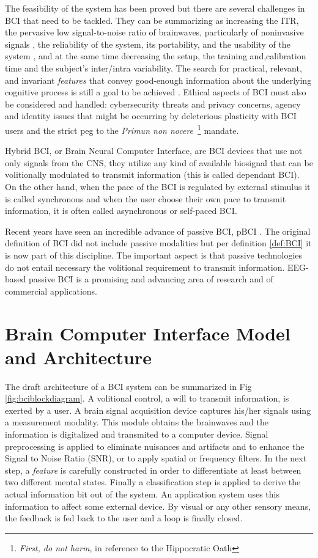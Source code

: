The feasibility of the system has been proved but there are several challenges in BCI that need to be tackled. They can be summarizing as 
increasing the ITR, the pervasive low signal-to-noise ratio of brainwaves, particularly of noninvasive signals \cite{Lotte2018}, the reliability of the system, its portability, and the usability of the system \cite{Wang2018}, and at the same time decreasing the setup, the training and,calibration time and the subject's inter/intra variability. The search for practical, relevant, and invariant \textit{features} that convey good-enough information about the underlying cognitive process is still a goal to be achieved \cite{Perdikis2014}.  Ethical aspects of BCI \cite{Yuste2017} must also be considered and handled: cybersecurity threats and privacy concerns,  agency and identity issues that might be occurring by deleterious plasticity with BCI users and the strict peg to the \textit{Primun non nocere}~\footnote{\textit{First, do not harm}, in reference to the Hippocratic Oath} mandate.

Hybrid BCI, or Brain Neural Computer Interface, are BCI devices that use not only signals from the CNS, they utilize any kind of available biosignal that can be volitionally modulated to transmit information (this is called dependant BCI).  On the other hand, when the pace of the BCI is regulated by external stimulus it is called synchronous and when the user choose their own pace to transmit information, it is often called asynchronous or self-paced BCI.

Recent years have seen an incredible advance of passive BCI, pBCI \cite{Zander2010}.  The original definition of BCI did not include passive modalities but per definition \ref{def:BCI} it is now part of this discipline.  The important aspect is that passive technologies do not entail necessary the volitional requirement to transmit information.  EEG-based passive BCI is a promising and advancing area of research and of commercial applications.

\section{Brain Computer Interface Model and Architecture}

The draft architecture of a BCI system can be summarized in Fig \ref{fig:bciblockdiagram}.  A volitional control, a will to transmit information, is exerted by a user. A brain signal acquisition device captures his/her signals using a measurement modality.  This module obtains the brainwaves and the information is digitalized and transmited to a computer device.  Signal preprocessing is applied to eliminate nuisances and artifacts and to enhance the Signal to Noise Ratio (SNR), or to apply spatial or frequency filters.  In the next step, a \textit{feature} is carefully constructed in order to differentiate at least between two different mental states.  Finally a classification step is applied to derive the actual information bit out of the system.   An application system uses this information to affect some external device.  By visual or any other sensory means, the feedback is fed back to the user and a loop is finally closed.

